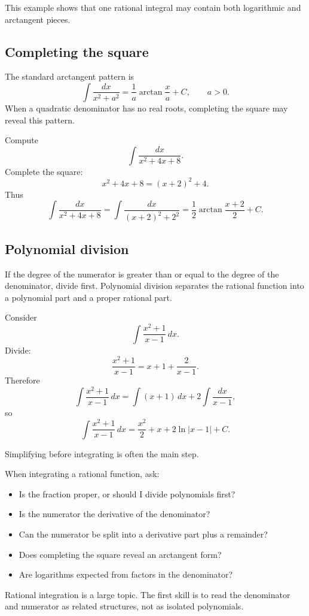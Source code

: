 This example shows that one rational integral may contain both logarithmic and arctangent pieces.

\subsection*{Completing the square}

The standard arctangent pattern is
\[
\int \frac{dx}{x^2+a^2}=\frac1a\arctan\frac{x}{a}+C,
\qquad a>0.
\]
When a quadratic denominator has no real roots, completing the square may reveal this pattern.

\begin{examplebox}
Compute
\[
\int \frac{dx}{x^2+4x+8}.
\]
Complete the square:
\[
x^2+4x+8=(x+2)^2+4.
\]
Thus
\[
\int \frac{dx}{x^2+4x+8}
=\int \frac{dx}{(x+2)^2+2^2}
=\frac12\arctan\frac{x+2}{2}+C.
\]
\end{examplebox}

\subsection*{Polynomial division}

If the degree of the numerator is greater than or equal to the degree of the denominator, divide first. Polynomial division separates the rational function into a polynomial part and a proper rational part.

\begin{examplebox}
Consider
\[
\int \frac{x^2+1}{x-1}\,dx.
\]
Divide:
\[
\frac{x^2+1}{x-1}=x+1+\frac2{x-1}.
\]
Therefore
\[
\int \frac{x^2+1}{x-1}\,dx
=\int (x+1)\,dx+2\int \frac{dx}{x-1},
\]
so
\[
\int \frac{x^2+1}{x-1}\,dx
=\frac{x^2}{2}+x+2\ln|x-1|+C.
\]
\end{examplebox}

Simplifying before integrating is often the main step.

\begin{summarybox}
When integrating a rational function, ask:
\begin{itemize}
\item Is the fraction proper, or should I divide polynomials first?
\item Is the numerator the derivative of the denominator?
\item Can the numerator be split into a derivative part plus a remainder?
\item Does completing the square reveal an arctangent form?
\item Are logarithms expected from factors in the denominator?
\end{itemize}
\end{summarybox}

Rational integration is a large topic. The first skill is to read the denominator and numerator as related structures, not as isolated polynomials.
